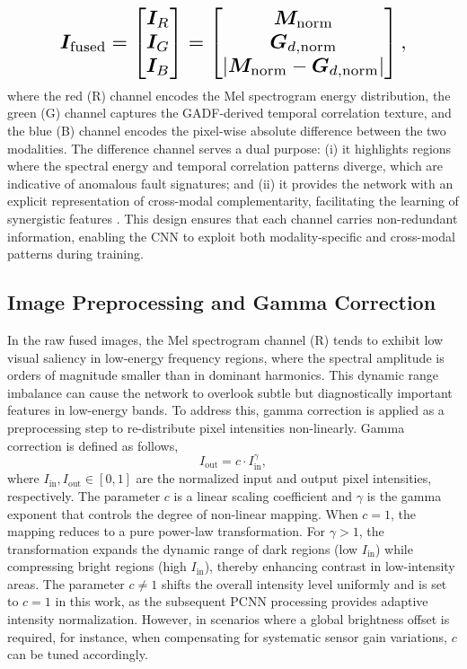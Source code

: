 \documentclass[twocolumn,iicol,pdflatex,sn-mathphys-num]{sn-jnl}%
\begin{document}
\begin{equation}
	\resizebox{0.8\columnwidth}{!}{$\bm{I}_{\text{fused}} = \begin{bmatrix}
		\bm{I}_R \\ \bm{I}_G \\ \bm{I}_B
	\end{bmatrix} = \begin{bmatrix}
		\bm{M}_{\text{norm}} \\
		\bm{G}_{d,\text{norm}} \\
		|\bm{M}_{\text{norm}} - \bm{G}_{d,\text{norm}}|
	\end{bmatrix},$}
\end{equation}
where the red (R) channel encodes the Mel spectrogram energy distribution, the green (G) channel captures the GADF-derived temporal correlation texture, and the blue (B) channel encodes the pixel-wise absolute difference between the two modalities. The difference channel serves a dual purpose: (i) it highlights regions where the spectral energy and temporal correlation patterns diverge, which are indicative of anomalous fault signatures; and (ii) it provides the network with an explicit representation of cross-modal complementarity, facilitating the learning of synergistic features \cite{9673131}. This design ensures that each channel carries non-redundant information, enabling the CNN to exploit both modality-specific and cross-modal patterns during training.

\subsection{Image Preprocessing and Gamma Correction}
In the raw fused images, the Mel spectrogram channel (R) tends to exhibit low visual saliency in low-energy frequency regions, where the spectral amplitude is orders of magnitude smaller than in dominant harmonics. This dynamic range imbalance can cause the network to overlook subtle but diagnostically important features in low-energy bands. To address this, gamma correction is applied as a preprocessing step to re-distribute pixel intensities non-linearly. Gamma correction \cite{8362729} is defined as follows,
\begin{equation}
	I_{\text{out}} = c \cdot I_{\text{in}}^{\gamma},
\end{equation}
\noindent where $I_{\text{in}}, I_{\text{out}} \in [0, 1]$ are the normalized input and output pixel intensities, respectively. The parameter $c$ is a linear scaling coefficient and $\gamma$ is the gamma exponent that controls the degree of non-linear mapping. When $c = 1$, the mapping reduces to a pure power-law transformation. For $\gamma > 1$, the transformation expands the dynamic range of dark regions (low $I_{\text{in}}$) while compressing bright regions (high $I_{\text{in}}$), thereby enhancing contrast in low-intensity areas. The parameter $c \neq 1$ shifts the overall intensity level uniformly and is set to $c = 1$ in this work, as the subsequent PCNN processing provides adaptive intensity normalization. However, in scenarios where a global brightness offset is required, for instance, when compensating for systematic sensor gain variations, $c$ can be tuned accordingly.
\end{document}
